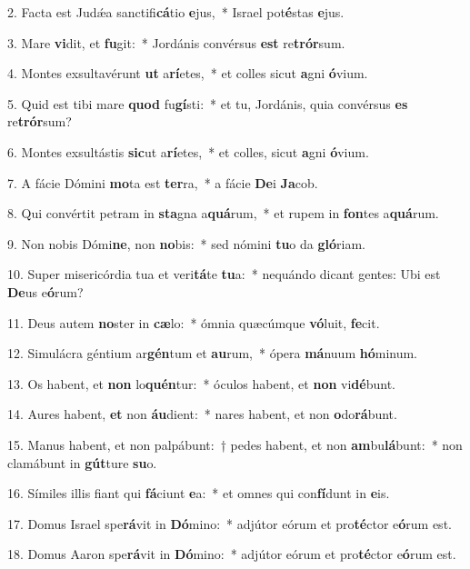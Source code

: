 \item 2. Facta est Judǽa sanctifi\textbf{cá}tio \textbf{e}jus,~* Israel pot\textbf{é}stas \textbf{e}jus.
\item 3. Mare \textbf{vi}dit, et \textbf{fu}git:~* Jordánis convérsus \textbf{est} re\textbf{trór}sum.
\item 4. Montes exsultavérunt \textbf{ut} a\textbf{rí}etes,~* et colles sicut \textbf{a}gni \textbf{ó}vium.
\item 5. Quid est tibi mare \textbf{quod} fu\textbf{gí}sti:~* et tu, Jordánis, quia convérsus \textbf{es} re\textbf{trór}sum?
\item 6. Montes exsultástis \textbf{sic}ut a\textbf{rí}etes,~* et colles, sicut \textbf{a}gni \textbf{ó}vium.
\item 7. A fácie Dómini \textbf{mo}ta est \textbf{ter}ra,~* a fácie \textbf{De}i \textbf{Ja}cob.
\item 8. Qui convértit petram in \textbf{sta}gna a\textbf{quá}rum,~* et rupem in \textbf{fon}tes a\textbf{quá}rum.
\item 9. Non nobis Dómi\textbf{ne}, non \textbf{no}bis:~* sed nómini \textbf{tu}o da \textbf{gló}riam.
\item 10. Super misericórdia tua et veri\textbf{tá}te \textbf{tu}a:~* nequándo dicant gentes: Ubi est \textbf{De}us e\textbf{ó}rum?
\item 11. Deus autem \textbf{no}ster in \textbf{cæ}lo:~* ómnia quæcúmque \textbf{vó}luit, \textbf{fe}cit.
\item 12. Simulácra géntium ar\textbf{gén}tum et \textbf{au}rum,~* ópera \textbf{má}nuum \textbf{hó}minum.
\item 13. Os habent, et \textbf{non} lo\textbf{quén}tur:~* óculos habent, et \textbf{non} vi\textbf{dé}bunt.
\item 14. Aures habent, \textbf{et} non \textbf{áu}dient:~* nares habent, et non \textbf{o}do\textbf{rá}bunt.
\item 15. Manus habent, et non palpábunt:~† pedes habent, et non \textbf{am}bu\textbf{lá}bunt:~* non clamábunt in \textbf{gút}ture \textbf{su}o.
\item 16. Símiles illis fiant qui \textbf{fá}ciunt \textbf{e}a:~* et omnes qui con\textbf{fí}dunt in \textbf{e}is.
\item 17. Domus Israel spe\textbf{rá}vit in \textbf{Dó}mino:~* adjútor eórum et pro\textbf{té}ctor e\textbf{ó}rum est.
\item 18. Domus Aaron spe\textbf{rá}vit in \textbf{Dó}mino:~* adjútor eórum et pro\textbf{té}ctor e\textbf{ó}rum est.
